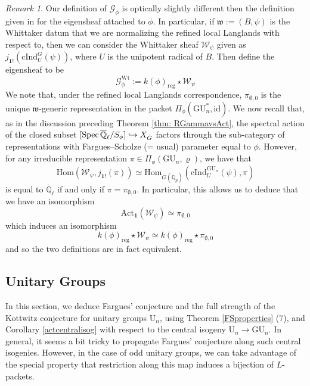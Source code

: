 \documentclass[reqno,11pt]{amsart}
\theoremstyle{remark}
\newtheorem{remark}[theorem]{Remark}
\def\Spec{\mathop{\rm Spec}}
\newcommand{\GU}{\mathrm{GU}}
\newcommand{\U}{\mathrm{U}}
\newcommand{\id}{\mathrm{id}}
\newcommand{\mf}{\mathfrak}
\newcommand{\Act}{\mathrm{Act}}
\def\ol{\overline}
\def\ra{\rightarrow}
\begin{document}
\begin{remark}{\label{rem: whittvgen}}
Our definition of $\mathcal{G}_{\phi}$ is optically slightly different then the definition given in \cite[Page~39]{FS} \cite[Definition~7.3]{AL} for the eigensheaf attached to $\phi$. In particular, if $\mf{w} := (B,\psi)$ is the Whittaker datum that we are normalizing the refined local Langlands with respect to, then we can consider the Whittaker sheaf $\mathcal{W}_{\psi}$ given as $j_{\mathbf{1}!}(\mathrm{cInd}_{U}^{G}(\psi))$, where $U$ is the unipotent radical of $B$. Then \cite{FS,AL} define the eigensheaf to be 
\[ \mathcal{G}_{\phi}^{\mathrm{Wt}} := k(\phi)_{\mathrm{reg}} \star \mathcal{W}_{\psi} \]
We note that, under the refined local Langlands correspondence, $\pi_{\emptyset,0}$ is the unique $\mf{w}$-generic representation in the packet $\Pi_{\phi}(\mathrm{GU}^{*}_{n},\id)$. We now recall that, as in the discussion preceding Theorem \ref{thm: RGammavsAct}, the spectral action of the closed subset $[\Spec{\ol{\mathbb{Q}}}_{\ell}/S_{\phi}] \hookrightarrow X_{\hat{G}}$ factors through the sub-category of representations with Fargues--Scholze (= usual) parameter equal to $\phi$. However, for any irreducible representation $\pi \in \Pi_{\phi}(\GU_{n},\varrho)$, we have that 
\[ \mathrm{Hom}(\mathcal{W}_{\psi},j_{\mathbf{1}!}(\pi)) \simeq  \mathrm{Hom}_{G(\mathbb{Q}_{p})}(\mathrm{cInd}_{U}^{\GU_{n}}(\psi),\pi) \]
is equal to $\ol{\mathbb{Q}}_{\ell}$ if and only if $\pi = \pi_{\emptyset,0}$. In particular, this allows us to deduce that we have an isomorphism
\[ \Act_{\mathbf{1}}(\mathcal{W}_{\psi}) \simeq \pi_{\emptyset,0} \]
which induces an isomorphism
\[ k(\phi)_{\mathrm{reg}} \star \mathcal{W}_{\psi} \simeq k(\phi)_{\mathrm{reg}} \star \pi_{\emptyset,0} \]
and so the two definitions are in fact equivalent. 
\end{remark} 

\subsection{Unitary Groups}{\label{ss: unitarygroupapps}}
In this section, we deduce Fargues' conjecture and the full strength of the Kottwitz conjecture for unitary groups $\U_{n}$, using Theorem \ref{FSproperties} (7), and Corollary \ref{actcentralisog} with respect to the central isogeny $\U_{n} \ra \GU_{n}$. In general, it seems a bit tricky to propagate Fargues' conjecture along such central isogenies. However, in the case of odd unitary groups, we can take advantage of the special property that restriction along this map induces a bijection of $L$-packets.  
\end{document}
